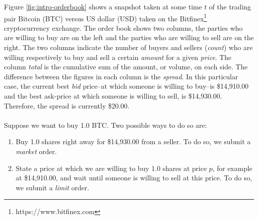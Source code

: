 Figure \ref{fig:intro-orderbook} shows a snapshot taken at some time $t$ of the trading pair Bitcoin (BTC) versus US dollar (USD) taken on the Bitfinex\footnote{https://www.bitfinex.com} cryptocurrency exchange.
The order book shows two columns, the parties who are willing to buy are on the left and the parties who are willing to sell are on the right.
The two columns indicate the number of buyers and sellers (\textit{count}) who are willing respectively to buy and sell a certain \textit{amount} for a given \textit{price}.
The column \textit{total} is the cumulative sum of the amount, or volume, on each side.
The difference between the figures in each column is the \textit{spread}.
In this particular case, the current best \textit{bid} price--at which someone is willing to buy--is \$14,910.00 and the best ask-price at which someone is willing to sell, is \$14,930.00.
Therefore, the spread is currently \$20.00.
\\
\\
Suppose we want to buy 1.0 BTC.
Two possible ways to do so are:
\begin{enumerate}
    \item Buy 1.0 shares right away for \$14,930.00 from a seller. To do so, we submit a \textit{market} order.
    \item State a price at which we are willing to buy 1.0 shares at price $p$, for example at \$14,910.00, and wait until someone is willing to sell at this price. To do so, we submit a \textit{limit} order.
\end{enumerate}

